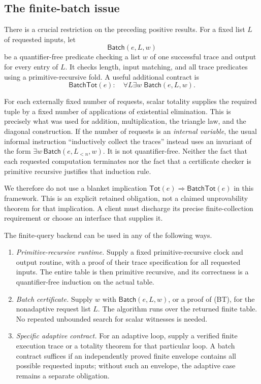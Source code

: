 \subsection{The finite-batch issue}
\label{subsec:batch-totality}

There is a crucial restriction on the preceding positive results. For a
fixed list $L$ of requested inputs, let
\[
 \mathsf{Batch}(e,L,w)
\]
be a quantifier-free predicate checking a list $w$ of one successful trace
and output for every entry of $L$. It checks length, input matching, and all
trace predicates using a primitive-recursive fold. A useful additional
contract is
\[
 \mathsf{BatchTot}(e):\quad
       \forall L\exists w\;\mathsf{Batch}(e,L,w).
 \tag{BT}
\]

For each externally fixed number of requests, scalar totality supplies the
required tuple by a fixed number of applications of existential elimination.
This is precisely what was used for addition, multiplication, the triangle
law, and the diagonal construction. If the number of requests is an
\emph{internal variable}, the usual informal instruction ``inductively
collect the traces'' instead uses an invariant of the form
$\exists w\,\mathsf{Batch}(e,L_{<n},w)$. It is not quantifier-free. Neither
the fact that each requested computation terminates nor the fact that a
certificate checker is primitive recursive justifies that induction rule.

We therefore do not use a blanket implication
$\mathsf{Tot}(e)\Rightarrow\mathsf{BatchTot}(e)$ in this framework. This is
an explicit retained obligation, not a claimed unprovability theorem for
that implication. A client must discharge its precise finite-collection
requirement or choose an interface that supplies it.

\begin{proposition}
\label{prop:batch-interfaces}
The finite-query backend can be used in any of the following ways.
\begin{enumerate}
\item \emph{Primitive-recursive runtime.} Supply a fixed primitive-recursive
clock and output routine, with a proof of their trace specification for all
requested inputs. The entire table is then primitive recursive, and its
correctness is a quantifier-free induction on the actual table.
\item \emph{Batch certificate.} Supply $w$ with
$\mathsf{Batch}(e,L,w)$, or a proof of (BT), for the nonadaptive request list
$L$. The algorithm runs over the returned finite table. No repeated
unbounded search for scalar witnesses is needed.
\item \emph{Specific adaptive contract.} For an adaptive loop, supply a
verified finite execution trace or a totality theorem for that particular
loop. A batch contract suffices if an independently proved finite envelope
contains all possible requested inputs; without such an envelope, the
adaptive case remains a separate obligation.
\end{enumerate}
\end{proposition}

